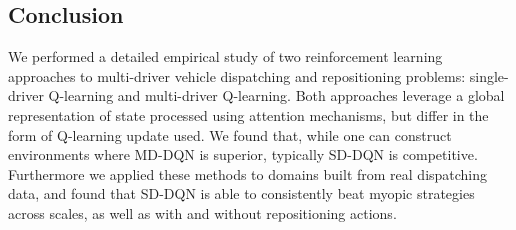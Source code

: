 \subsection{Conclusion}
We performed a detailed empirical study of two reinforcement learning approaches to multi-driver vehicle dispatching and repositioning problems: single-driver Q-learning and multi-driver Q-learning. Both approaches leverage a global representation of state processed using attention mechanisms, but differ in the form of Q-learning update used. We found that, while one can construct environments where MD-DQN is superior, typically SD-DQN is competitive. Furthermore we applied these methods to domains built from real dispatching data, and found that SD-DQN is able to consistently beat myopic strategies across scales, as well as with and without repositioning actions.


